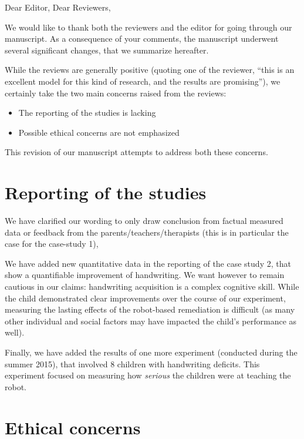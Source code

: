 \documentclass{article}
\begin{document}
Dear Editor, Dear Reviewers,

\vspace{2em}

We would like to thank both the reviewers and the editor for going through our
manuscript. As a consequence of your comments, the manuscript underwent
several significant changes, that we summarize hereafter.

While the reviews are generally positive (quoting one of the reviewer, ``this
is an excellent model for this kind of research, and the results are
promising''), we certainly take the two main concerns raised from the reviews:

\begin{itemize}
    \item The reporting of the studies is lacking
    \item Possible ethical concerns are not emphasized
\end{itemize}

This revision of our manuscript attempts to address both these concerns.

\section*{Reporting of the studies}

We have clarified our wording to only draw conclusion from factual measured
data or feedback from the parents/teachers/therapists (this is in particular
the case for the case-study 1),

We have added new quantitative data in the reporting of the case study 2, that
show a quantifiable improvement of handwriting. We want however to remain
cautious in our claims: handwriting acquisition is a complex cognitive skill.
While the child demonstrated clear improvements over the course of our
experiment, measuring the lasting effects of the robot-based remediation is
difficult (as many other individual and social factors may have impacted the
child's performance as well).

Finally, we have added the results of one more experiment (conducted during the
summer 2015), that involved 8 children with handwriting deficits. This
experiment focused on measuring how \emph{serious} the children were at
teaching the robot.

\section*{Ethical concerns}
\end{document}
